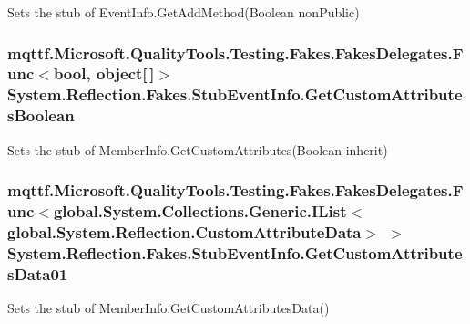 Sets the stub of Event\-Info.\-Get\-Add\-Method(\-Boolean non\-Public)

\hypertarget{class_system_1_1_reflection_1_1_fakes_1_1_stub_event_info_a9192440c6dddb3dfb1285011be386fb4}{
\subsubsection[{Get\-Custom\-Attributes\-Boolean}]{\setlength{\rightskip}{0pt plus 5cm}mqttf.\-Microsoft.\-Quality\-Tools.\-Testing.\-Fakes.\-Fakes\-Delegates.\-Func$<$bool, object\mbox{[}$\,$\mbox{]}$>$ System.\-Reflection.\-Fakes.\-Stub\-Event\-Info.\-Get\-Custom\-Attributes\-Boolean}}\label{class_system_1_1_reflection_1_1_fakes_1_1_stub_event_info_a9192440c6dddb3dfb1285011be386fb4}


Sets the stub of Member\-Info.\-Get\-Custom\-Attributes(\-Boolean inherit)

\hypertarget{class_system_1_1_reflection_1_1_fakes_1_1_stub_event_info_a3218d4d3dc2839f95eee0ea2410f3791}{
\subsubsection[{Get\-Custom\-Attributes\-Data01}]{\setlength{\rightskip}{0pt plus 5cm}mqttf.\-Microsoft.\-Quality\-Tools.\-Testing.\-Fakes.\-Fakes\-Delegates.\-Func$<$global.\-System.\-Collections.\-Generic.\-I\-List$<$global.\-System.\-Reflection.\-Custom\-Attribute\-Data$>$ $>$ System.\-Reflection.\-Fakes.\-Stub\-Event\-Info.\-Get\-Custom\-Attributes\-Data01}}\label{class_system_1_1_reflection_1_1_fakes_1_1_stub_event_info_a3218d4d3dc2839f95eee0ea2410f3791}


Sets the stub of Member\-Info.\-Get\-Custom\-Attributes\-Data()

